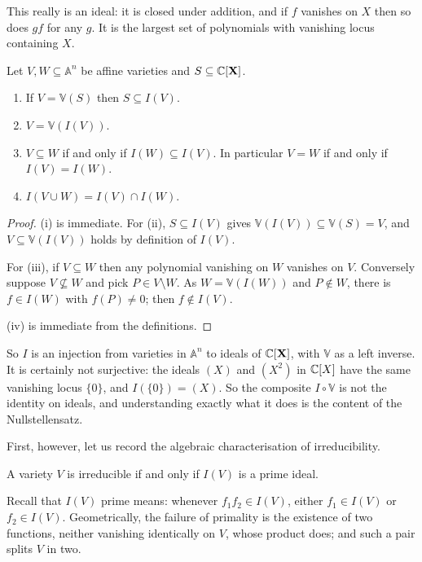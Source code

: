 \documentclass[a4paper]{scrartcl}
\newcommand{\A}{\mathbb{A}}
\newcommand{\V}{\mathbb{V}}
\begin{document}
This really is an ideal: it is closed under addition, and if $f$ vanishes on $X$ then so does $gf$ for any $g$. It is the largest set of polynomials with vanishing locus containing $X$.

\begin{proposition}\label{prop:IVbasic}
	Let $V, W \subseteq \A^n$ be affine varieties and $S \subseteq \mathbb{C}[\mathbf{X}]$.
	\begin{enumerate}[label=(\roman*)]
		\item If $V = \V(S)$ then $S \subseteq I(V)$.
		\item $V = \V(I(V))$.
		\item $V \subseteq W$ if and only if $I(W) \subseteq I(V)$. In particular $V = W$ if and only if $I(V) = I(W)$.
		\item $I(V \cup W) = I(V) \cap I(W)$.
	\end{enumerate}
\end{proposition}

\begin{proof}
	(i) is immediate. For (ii), $S \subseteq I(V)$ gives $\V(I(V)) \subseteq \V(S) = V$, and $V \subseteq \V(I(V))$ holds by definition of $I(V)$.

	For (iii), if $V \subseteq W$ then any polynomial vanishing on $W$ vanishes on $V$. Conversely suppose $V \not\subseteq W$ and pick $P \in V \setminus W$. As $W = \V(I(W))$ and $P \notin W$, there is $f \in I(W)$ with $f(P) \neq 0$; then $f \notin I(V)$.

	(iv) is immediate from the definitions.
\end{proof}

So $I$ is an injection from varieties in $\A^n$ to ideals of $\mathbb{C}[\mathbf{X}]$, with $\V$ as a left inverse. It is certainly not surjective: the ideals $(X)$ and $(X^2)$ in $\mathbb{C}[X]$ have the same vanishing locus $\{0\}$, and $I(\{0\}) = (X)$. So the composite $I \circ \V$ is not the identity on ideals, and understanding exactly what it does is the content of the Nullstellensatz.

First, however, let us record the algebraic characterisation of irreducibility.

\begin{proposition}\label{prop:irrprime}
	A variety $V$ is irreducible if and only if $I(V)$ is a prime ideal.
\end{proposition}

Recall that $I(V)$ prime means: whenever $f_1 f_2 \in I(V)$, either $f_1 \in I(V)$ or $f_2 \in I(V)$. Geometrically, the failure of primality is the existence of two functions, neither vanishing identically on $V$, whose product does; and such a pair splits $V$ in two.
\end{document}
